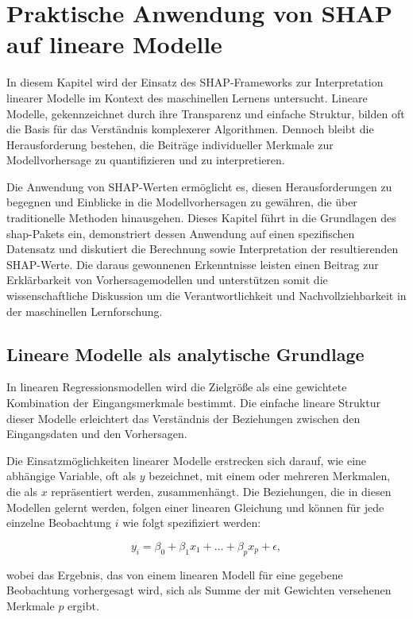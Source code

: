 \chapter{Praktische Anwendung von \acs{SHAP} auf lineare Modelle}

In diesem Kapitel wird der Einsatz des \acs{SHAP}-Frameworks zur Interpretation linearer Modelle im 
Kontext des maschinellen Lernens untersucht. Lineare Modelle, gekennzeichnet durch ihre Transparenz 
und einfache Struktur, bilden oft die Basis für das Verständnis komplexerer Algorithmen. 
Dennoch bleibt die Herausforderung bestehen, die Beiträge individueller Merkmale zur Modellvorhersage zu 
quantifizieren und zu interpretieren.

Die Anwendung von \acs{SHAP}-Werten ermöglicht es, diesen Herausforderungen zu begegnen und Einblicke in 
die Modellvorhersagen zu gewähren, die über traditionelle Methoden hinausgehen. 
Dieses Kapitel führt in die Grundlagen des \textsf{shap}-Pakets ein, demonstriert dessen Anwendung auf einen 
spezifischen Datensatz und diskutiert die Berechnung sowie Interpretation der resultierenden \acs{SHAP}-Werte. 
Die daraus gewonnenen Erkenntnisse leisten einen Beitrag zur Erklärbarkeit von Vorhersagemodellen und 
unterstützen somit die wissenschaftliche Diskussion um die Verantwortlichkeit und Nachvollziehbarkeit 
in der maschinellen Lernforschung.

\section{Lineare Modelle als analytische Grundlage}

In linearen Regressionsmodellen wird die Zielgröße als eine gewichtete Kombination der Eingangsmerkmale bestimmt. 
Die einfache lineare Struktur dieser Modelle erleichtert das Verständnis der Beziehungen zwischen den Eingangsdaten 
und den Vorhersagen. 

Die Einsatzmöglichkeiten linearer Modelle erstrecken sich darauf, wie eine abhängige Variable, oft als $y$ bezeichnet, 
mit einem oder mehreren Merkmalen, die als $x$ repräsentiert werden, zusammenhängt. Die Beziehungen, die in diesen Modellen 
gelernt werden, folgen einer linearen Gleichung und können für jede einzelne Beobachtung $i$ wie folgt spezifiziert werden:

\[
    y_i = \beta_0 + \beta_1 x_1 + \ldots + \beta_p x_p + \epsilon,
\]

wobei das Ergebnis, das von einem linearen Modell für eine gegebene Beobachtung vorhergesagt wird, sich als Summe der mit 
Gewichten versehenen Merkmale $p$ ergibt.

